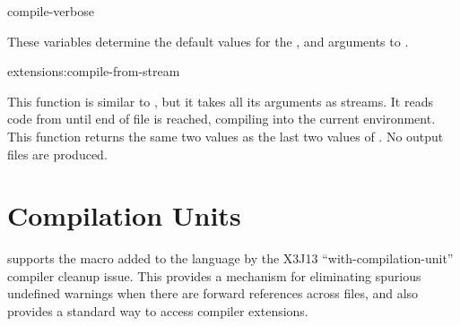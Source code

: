 \begin{defvar}{}{compile-verbose}
  
  These variables determine the default values for the ,
   and  arguments to .
\end{defvar}

\begin{defun}{extensions:}{compile-from-stream}{%
    }
  
  This function is similar to , but it takes all
  its arguments as streams.  It reads \llisp{} code from
   until end of file is reached, compiling into the
  current environment.  This function returns the same two values as
  the last two values of .  No output files are
  produced.
\end{defun}


\section{Compilation Units}

\cmucl{} supports the  macro added to the
language by the X3J13 ``with-compilation-unit'' compiler cleanup
issue.  This provides a mechanism for eliminating spurious undefined
warnings when there are forward references across files, and also
provides a standard way to access compiler extensions.

